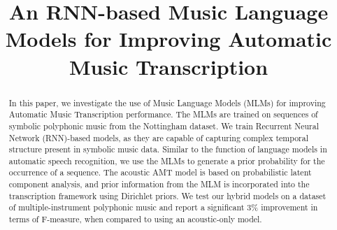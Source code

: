 \documentclass{article}
\title{An RNN-based Music Language Models for Improving Automatic Music Transcription}
\begin{document}
%
\maketitle
%

\begin{abstract}
In this paper, we investigate the use of Music Language Models (MLMs) for improving Automatic Music Transcription performance. The MLMs are trained on sequences of symbolic polyphonic music from the Nottingham dataset. We train Recurrent Neural Network (RNN)-based models, as they are capable of capturing complex temporal structure present in symbolic music data. Similar to the function of language models in automatic speech recognition, we use the MLMs to generate a prior probability for the occurrence of a sequence. The acoustic AMT model is based on probabilistic latent component analysis, and prior information from the MLM is incorporated into the transcription framework using Dirichlet priors. We test our hybrid models on a dataset of multiple-instrument polyphonic music and report a significant 3\% improvement in terms of F-measure, when compared to using an acoustic-only model.

\end{abstract}












{\small 

}
\end{document}
